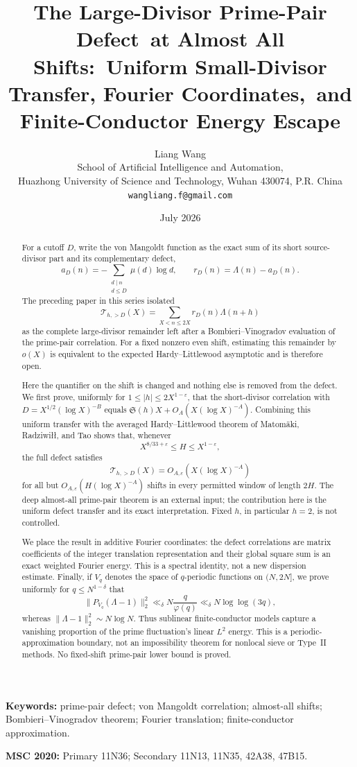 \documentclass[11pt]{article}
\title{\textbf{The Large-Divisor Prime-Pair Defect}\
\textbf{at Almost All Shifts:}\
\textbf{Uniform Small-Divisor Transfer, Fourier Coordinates,}\
\textbf{and Finite-Conductor Energy Escape}}
\author{Liang Wang\\
\small School of Artificial Intelligence and Automation,\\[-0.2em]
\small Huazhong University of Science and Technology, Wuhan 430074, P.R. China\\
\small \texttt{wangliang.f@gmail.com}}
\date{July 2026}
\theoremstyle{definition}
\theoremstyle{remark}
\newcommand{\eps}{\varepsilon}
\newcommand{\cT}{\mathcal T}
\begin{document}
\maketitle

\begin{abstract}
For a cutoff $D$, write the von Mangoldt function as the exact sum of its
short source-divisor part and its complementary defect,
\[
 a_D(n)=-\sum_{\substack{d\mid n\\d\le D}}\mu(d)\log d,
 \qquad
 r_D(n)=\Lambda(n)-a_D(n).
\]
The preceding paper in this series isolated
\[
 \cT_{h,>D}(X)=\sum_{X<n\le2X}r_D(n)\Lambda(n+h)
\]
as the complete large-divisor remainder left after a
Bombieri--Vinogradov evaluation of the prime-pair correlation.  For a fixed
nonzero even shift, estimating this remainder by $o(X)$ is equivalent to the
expected Hardy--Littlewood asymptotic and is therefore open.

Here the quantifier on the shift is changed and nothing else is removed from
the defect.  We first prove, uniformly for
$1\le |h|\le 2X^{1-\eps}$, that the short-divisor correlation with
$D=X^{1/2}(\log X)^{-B}$ equals
$\mathfrak S(h)X+O_A(X(\log X)^{-A})$.  Combining this uniform transfer with
the averaged Hardy--Littlewood theorem of Matom\"aki, Radziwi\l\l, and Tao
shows that, whenever
\[
 X^{8/33+\eps}\le H\le X^{1-\eps},
\]
the full defect satisfies
\[
 \cT_{h,>D}(X)=O_{A,\eps}(X(\log X)^{-A})
\]
for all but $O_{A,\eps}(H(\log X)^{-A})$ shifts in every permitted window of
length $2H$.  The deep almost-all prime-pair theorem is an external input;
the contribution here is the uniform defect transfer and its exact
interpretation.  Fixed $h$, in particular $h=2$, is not controlled.

We place the result in additive Fourier coordinates: the defect correlations
are matrix coefficients of the integer translation representation and their
global square sum is an exact weighted Fourier energy.  This is a spectral
identity, not a new dispersion estimate.  Finally, if $V_q$ denotes the
space of $q$-periodic functions on $(N,2N]$, we prove uniformly for
$q\le N^{1-\delta}$ that
\[
 \|P_{V_q}(\Lambda-1)\|_2^2
 \ll_\delta N\frac q{\varphi(q)}
 \ll_\delta N\log\log(3q),
\]
whereas $\|\Lambda-1\|_2^2\sim N\log N$.  Thus sublinear finite-conductor
models capture a vanishing proportion of the prime fluctuation's linear
$L^2$ energy.  This is a periodic-approximation boundary, not an
impossibility theorem for nonlocal sieve or Type~II methods.  No fixed-shift
prime-pair lower bound is proved.
\end{abstract}

\noindent\textbf{Keywords:} prime-pair defect; von Mangoldt correlation;
almost-all shifts; Bombieri--Vinogradov theorem; Fourier translation;
finite-conductor approximation.

\medskip
\noindent\textbf{MSC 2020:} Primary 11N36; Secondary 11N13, 11N35, 42A38,
47B15.










\end{document}
